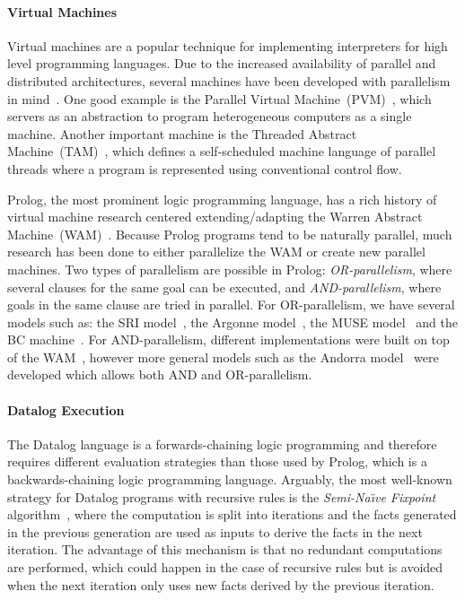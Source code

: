 \paragraph{Virtual Machines}

Virtual machines are a popular technique for implementing interpreters for high
level programming languages. Due to the increased availability of parallel
and distributed architectures, several machines have been developed with
parallelism in mind~\cite{Kara:1997:AMM:265274}. One good example is
the Parallel Virtual Machine~(PVM)~\cite{Sunderam90pvm:a}, which servers as an
abstraction to program heterogeneous computers as a single machine. Another
important machine is the Threaded Abstract
Machine~(TAM)~\cite{CullerGSvE93,goldstein-tr94}, which defines a self-scheduled
machine language of parallel threads where a program is represented using
conventional control flow.

Prolog, the most prominent logic programming language, has a rich history of
virtual machine research centered extending/adapting the Warren Abstract
Machine~(WAM)~\cite{AICPub641:1983}.  Because Prolog programs tend to be
naturally parallel, much research has been done to either parallelize the WAM or
create new parallel machines. Two types of parallelism are possible in Prolog:
\emph{OR-parallelism}, where several clauses for the same goal can be executed,
and \emph{AND-parallelism}, where goals in the same clause are tried in
parallel. For OR-parallelism, we have several models such as: the SRI
model~\cite{Warren:1987:OEM:67683.67699}, the Argonne
model~\cite{ButlerDLOOS88}, the MUSE model~\cite{Ali:1990fk} and the BC
machine~\cite{Ali88}. For AND-parallelism, different implementations were built
on top of the WAM~\cite{Hermenegildo:1986:AMB:913061,Lin:1988:AEL:900478},
however more general models such as the Andorra
model~\cite{Haridi:1990:KAP:87961.87964} were developed which allows both AND
and OR-parallelism.

\paragraph{Datalog Execution} The Datalog language is a forwards-chaining logic
programming and therefore requires different evaluation strategies than those
used by Prolog, which is a backwards-chaining logic programming language.
Arguably, the most well-known strategy for Datalog programs with recursive rules
is the \emph{Semi-Na\"{\i}ve Fixpoint}
algorithm~\cite{Balbin:1987:GDA:34657.34661}, where the computation is split
into iterations and the facts generated in the previous generation are used as
inputs to derive the facts in the next iteration. The advantage of this
mechanism is that no redundant computations are performed, which could happen in
the case of recursive rules but is avoided when the next iteration only uses new
facts derived by the previous iteration.
   
